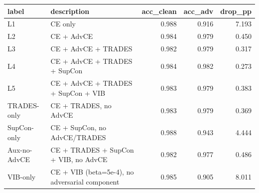 \begin{tabular}{llrrr}
\toprule
label & description & acc_clean & acc_adv & drop_pp \\
\midrule
L1 & CE only & 0.988 & 0.916 & 7.193 \\
L2 & CE + AdvCE & 0.984 & 0.979 & 0.450 \\
L3 & CE + AdvCE + TRADES & 0.982 & 0.979 & 0.317 \\
L4 & CE + AdvCE + TRADES + SupCon & 0.984 & 0.982 & 0.273 \\
L5 & CE + AdvCE + TRADES + SupCon + VIB & 0.983 & 0.979 & 0.383 \\
TRADES-only & CE + TRADES, no AdvCE & 0.983 & 0.979 & 0.369 \\
SupCon-only & CE + SupCon, no AdvCE/TRADES & 0.988 & 0.943 & 4.444 \\
Aux-no-AdvCE & CE + TRADES + SupCon + VIB, no AdvCE & 0.982 & 0.977 & 0.486 \\
VIB-only & CE + VIB (beta=5e-4), no adversarial component & 0.985 & 0.905 & 8.011 \\
\bottomrule
\end{tabular}
